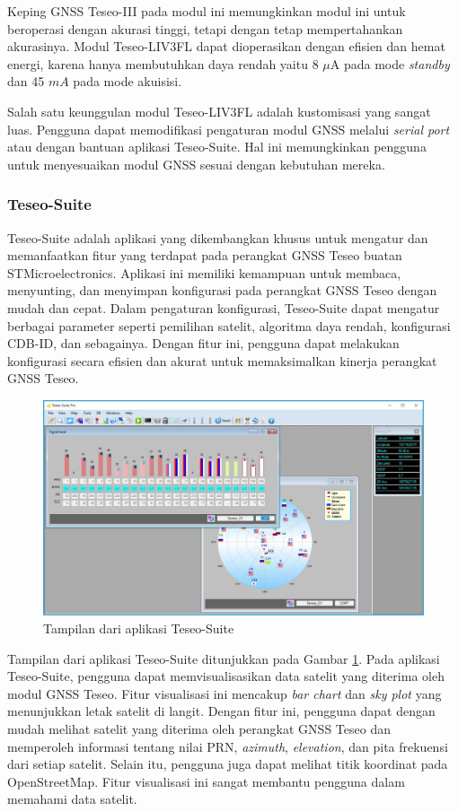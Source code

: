 Keping GNSS Teseo-III pada modul ini memungkinkan modul ini untuk beroperasi dengan akurasi tinggi, tetapi dengan tetap mempertahankan akurasinya. Modul Teseo\hyp{}LIV3FL dapat dioperasikan dengan efisien dan hemat energi, karena hanya membutuhkan daya rendah yaitu 8 $\mu$A pada mode \textit{standby} dan 45 $mA$ pada mode akuisisi.

Salah satu keunggulan modul Teseo\hyp{}LIV3FL adalah kustomisasi yang sangat luas. Pengguna dapat memodifikasi pengaturan modul GNSS melalui \textit{serial port} atau dengan bantuan aplikasi Teseo-Suite. Hal ini memungkinkan pengguna untuk menyesuaikan modul GNSS sesuai dengan kebutuhan mereka.

\subsubsection{Teseo-Suite}
Teseo-Suite adalah aplikasi yang dikembangkan khusus untuk mengatur dan memanfaatkan fitur yang terdapat pada perangkat GNSS Teseo buatan STMicroelectronics. Aplikasi ini memiliki kemampuan untuk membaca, menyunting, dan menyimpan konfigurasi pada perangkat GNSS Teseo dengan mudah dan cepat. Dalam pengaturan konfigurasi, Teseo-Suite dapat mengatur berbagai parameter seperti pemilihan satelit, algoritma daya rendah, konfigurasi CDB-ID, dan sebagainya. Dengan fitur ini, pengguna dapat melakukan konfigurasi secara efisien dan akurat untuk memaksimalkan kinerja perangkat GNSS Teseo.

\begin{figure}[H]
	\centering
	\includegraphics[width=13cm]{contents/chapter-2/teseo-suite.jpeg}
	\caption{Tampilan dari aplikasi Teseo-Suite}
	\label{Fig: teseo-suite-ss}
\end{figure}

Tampilan dari aplikasi Teseo-Suite ditunjukkan pada Gambar \ref{Fig: teseo-suite-ss}. Pada aplikasi Teseo-Suite, pengguna dapat memvisualisasikan data satelit yang diterima oleh modul GNSS Teseo. Fitur visualisasi ini mencakup \textit{bar chart} dan \textit{sky plot} yang menunjukkan letak satelit di langit. Dengan fitur ini, pengguna dapat dengan mudah melihat satelit yang diterima oleh perangkat GNSS Teseo dan memperoleh informasi tentang nilai PRN, \textit{azimuth}, \textit{elevation}, dan pita frekuensi dari setiap satelit. Selain itu, pengguna juga dapat melihat titik koordinat pada OpenStreetMap. Fitur visualisasi ini sangat membantu pengguna dalam memahami data satelit.

